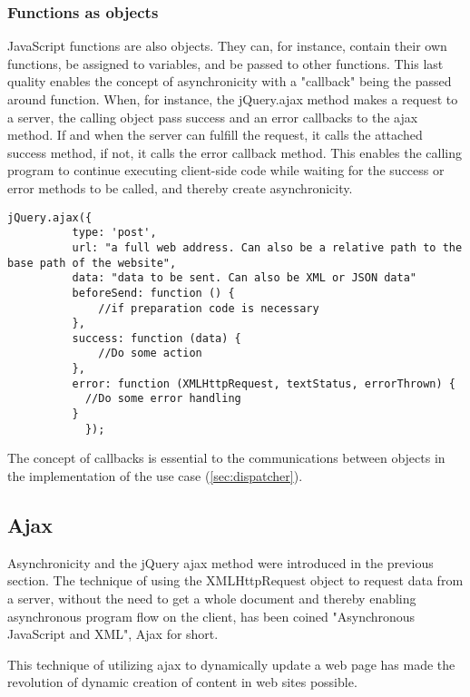 \documentclass[english]{ifimaster}
\begin{document}
 \subsubsection{Functions as objects}
\label{sec:functionObjects}
JavaScript functions are also objects. They can, for instance, contain their own functions, be assigned to variables, and be passed to other functions. This last quality enables the concept of asynchronicity with a "callback" being the passed around function. When, for instance, the jQuery.ajax method makes a request to a server, the calling object pass success and an error callbacks to the ajax method. If and when the server can fulfill the request, it calls the attached success method, if not, it calls the error callback method. This enables the calling program to continue executing client-side code while waiting for the success or error methods to be called, and thereby create asynchronicity.

\begin{lstlisting}[caption={The jQuery ajax method}, label={lst:ajax}]
 jQuery.ajax({
          type: 'post',
          url: "a full web address. Can also be a relative path to the base path of the website", 
          data: "data to be sent. Can also be XML or JSON data"
          beforeSend: function () {
              //if preparation code is necessary
          },
          success: function (data) {
              //Do some action
          },
          error: function (XMLHttpRequest, textStatus, errorThrown) {
            //Do some error handling
          }
            });

\end{lstlisting}

The concept of callbacks is essential to the communications between objects in the implementation of the use case (\ref{sec:dispatcher}). 

\subsection{Ajax}
Asynchronicity and the jQuery ajax method were introduced in the previous section. The technique of using the XMLHttpRequest object to request data from a server, without the need to get a whole document and thereby enabling asynchronous program flow on the client, has been coined "Asynchronous JavaScript and XML", Ajax for short. 

This technique of utilizing ajax to dynamically update a web page has made the revolution of dynamic creation of content in web sites possible.
\end{document}
